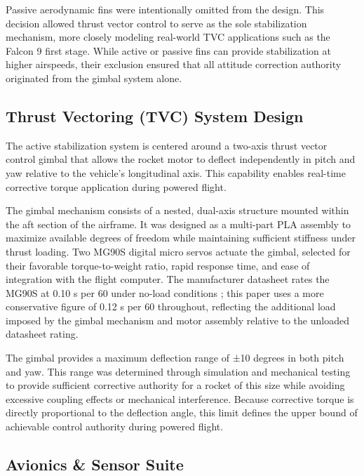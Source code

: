 Passive aerodynamic fins were intentionally omitted from the design. This decision allowed thrust vector control to serve as the sole stabilization mechanism, more closely modeling real-world TVC applications such as the Falcon 9 first stage. While active or passive fins can provide stabilization at higher airspeeds, their exclusion ensured that all attitude correction authority originated from the gimbal system alone.


\subsection{Thrust Vectoring (TVC) System Design}

The active stabilization system is centered around a two-axis thrust vector control gimbal that allows the rocket motor to deflect independently in pitch and yaw relative to the vehicle’s longitudinal axis. This capability enables real-time corrective torque application during powered flight.

The gimbal mechanism consists of a nested, dual-axis structure mounted within the aft section of the airframe. It was designed as a multi-part PLA assembly to maximize available degrees of freedom while maintaining sufficient stiffness under thrust loading. Two MG90S digital micro servos actuate the gimbal, selected for their favorable torque-to-weight ratio, rapid response time, and ease of integration with the flight computer. The manufacturer datasheet rates the MG90S at 0.10 s per 60\degree{} under no-load conditions \cite{towerpro_mg90s}; this paper uses a more conservative figure of 0.12 s per 60\degree{} throughout, reflecting the additional load imposed by the gimbal mechanism and motor assembly relative to the unloaded datasheet rating.

The gimbal provides a maximum deflection range of ±10 degrees in both pitch and yaw. This range was determined through simulation and mechanical testing to provide sufficient corrective authority for a rocket of this size while avoiding excessive coupling effects or mechanical interference. Because corrective torque is directly proportional to the deflection angle, this limit defines the upper bound of achievable control authority during powered flight.



\subsection{Avionics \& Sensor Suite}

